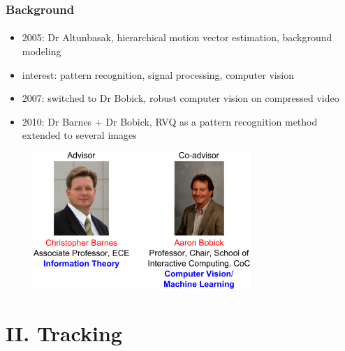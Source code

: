 \begin{frame}
\frametitle{Background}
\framesubtitle{}
\logoCSIPCPL\mypagenum
\vspace{0.2in}
\begin{itemize}
\item 2005: Dr Altunbasak, hierarchical motion vector estimation, background modeling
\item {\color{blue}interest}: pattern recognition, signal processing, computer vision
\item 2007: switched to Dr Bobick, robust computer vision on compressed video
\item 2010: Dr Barnes + Dr Bobick, RVQ as a pattern recognition method extended to several images
\end{itemize}
\begin{figure}
\includegraphics[width=0.73\textwidth]{thesis/professors.pdf}
\end{figure}
\end{frame}

\section{II. Tracking}

